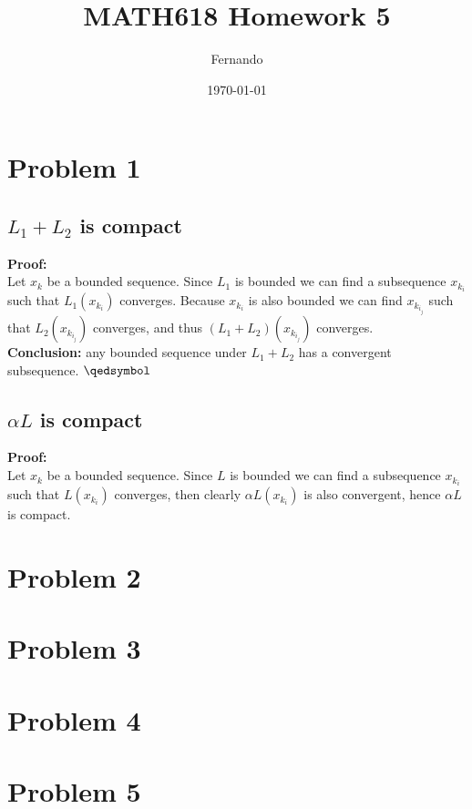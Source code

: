 \documentclass[12pt]{article}%
\begin{document}
\title{MATH618 Homework 5}
\author{Fernando}
\date{\today}
\maketitle
\section*{Problem 1}
\subsection*{$L_1+L_2$ is compact}
\textbf{Proof:}\\
Let $x_k$ be a bounded sequence. Since $L_1$ is bounded we can find a
subsequence $x_{k_i}$ such that $L_1(x_{k_i})$ converges. Because $x_{k_i}$ is
also bounded we can find $x_{k_{i_j}}$ such that $L_2(x_{k_{i_j}})$ converges,
and thus $(L_1+L_2)(x_{k_{i_j}})$ converges.\\
\textbf{Conclusion:} any bounded sequence under $L_1+L_2$
has a convergent subsequence. $\qedsymbol$
\subsection*{$\alpha L$ is compact}
\textbf{Proof:}\\
Let $x_k$ be a bounded sequence. Since $L$ is bounded we can find a subsequence
$x_{k_i}$ such that $L(x_{k_i})$ converges, then clearly $\alpha
L(x_{k_i})$ is also convergent, hence $\alpha L$ is compact.
\section*{Problem 2}
\section*{Problem 3}
\section*{Problem 4}
\section*{Problem 5}
\end{document}
